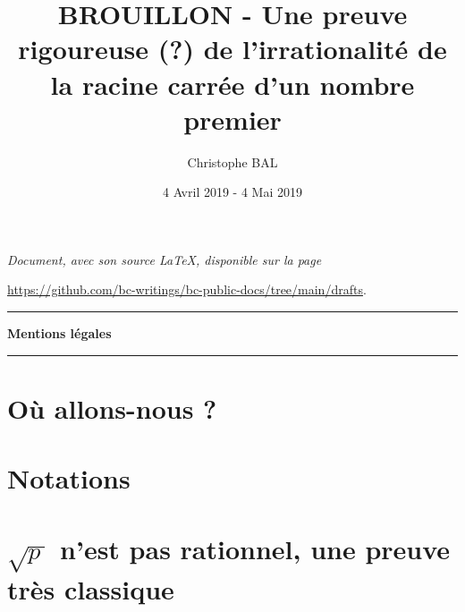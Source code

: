 \documentclass[12pt]{amsart}
\begin{document}
\title{BROUILLON - Une preuve rigoureuse (\!?) de l'irrationalité de la racine carrée d'un nombre premier}
\author{Christophe BAL}
\date{4 Avril 2019 - 4 Mai 2019}

\maketitle

\begin{center}
	\itshape
	Document, avec son source \LaTeX, disponible sur la page

	\url{https://github.com/bc-writings/bc-public-docs/tree/main/drafts}.
\end{center}


\bigskip


\begin{center}
	\hrule\vspace{.3em}
	{
		\fontsize{1.35em}{1em}\selectfont
		\textbf{Mentions \og légales \fg}
	}

	\vspace{0.45em}
	\doclicenseThis
	\hrule
\end{center}


\bigskip
\setcounter{tocdepth}{2}
\tableofcontents




\section{Où allons-nous ?}






\section{Notations}






\section{\texorpdfstring{$\sqrt{p\,}$ n'est pas rationnel, une preuve très classique}%
		                {Racine carrée de p n'est pas rationnel, une preuve très classique}}


\end{document}
